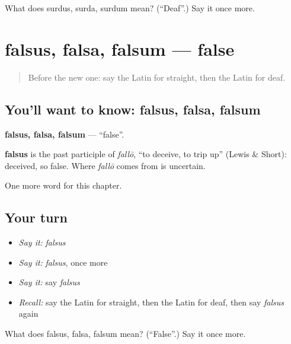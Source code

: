 \begin{tcolorbox}[breakable,colback=teal!4,colframe=teal!35!black,title={Before you move on}]
What does surdus, surda, surdum mean? (\textquotedblleft{}Deaf\textquotedblright{}.) Say it once more.
\end{tcolorbox}
\section[falsus, falsa, falsum]{falsus, falsa, falsum — false}

\label{lesson:LA-C147-falsus}



\begin{quote}
Before the new one: say the Latin for straight, then the Latin for deaf.
\end{quote}

\subsection*{You'll want to know: falsus, falsa, falsum}
\textbf{falsus, falsa, falsum} — \textquotedblleft{}false\textquotedblright{}.

\begin{cousinweb}
\textbf{falsus} is the past participle of \emph{fallō}, \textquotedblleft{}to deceive, to trip up\textquotedblright{} (Lewis \& Short): deceived, so false. Where \emph{fallō} comes from is uncertain.
\end{cousinweb}

\begin{grammarlens}[title={What you've built}]
One more word for this chapter.
\end{grammarlens}

\subsection*{Your turn}
\begin{itemize}
\raggedright
  \item \emph{Say it:} \emph{falsus}
  \item \emph{Say it:} \emph{falsus}, once more
  \item \emph{Say it:} say \emph{falsus}
  \item \emph{Recall:} say the Latin for straight, then the Latin for deaf, then say \emph{falsus} again
\end{itemize}

\begin{tcolorbox}[breakable,colback=teal!4,colframe=teal!35!black,title={Before you move on}]
What does falsus, falsa, falsum mean? (\textquotedblleft{}False\textquotedblright{}.) Say it once more.
\end{tcolorbox}
